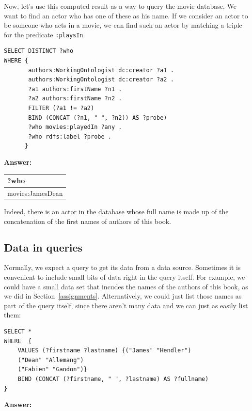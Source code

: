 Now, let's use this computed result as a way to query the movie
database. We want to find an actor who has one of these as his name. If
we consider an actor to be someone who acts in a movie, we can find such
an actor by matching a triple for the predicate \texttt{:playsIn}.


\begin{lstlisting}
SELECT DISTINCT ?who
WHERE {
       authors:WorkingOntologist dc:creator ?a1 . 
       authors:WorkingOntologist dc:creator ?a2 .
       ?a1 authors:firstName ?n1 .
       ?a2 authors:firstName ?n2 .
       FILTER (?a1 != ?a2)
       BIND (CONCAT (?n1, " ", ?n2)) AS ?probe)
       ?who movies:playedIn ?any .
       ?who rdfs:label ?probe .
      }
\end{lstlisting}


\textbf{\textbf{Answer:}}

\begin{tabular}{|l|}
\hline
?who\\
\hline
movies:JamesDean\\
\hline
\end{tabular}

Indeed, there is an actor in the database whose full name is made up of
the concatenation of the first names of authors of this book.

\subsection{Data in queries}
\label{sparqlvalues}

Normally, we expect a query to get its data from a data source.  Sometimes it 
is convenient to include small bits of data right in the query itself.  For example, we 
could have a small data set that incudes the names of the authors of this book, as we did in 
Section~\ref{assignments}.  Alternatively, we could just list those names 
as part of the query itself, since there aren't many data and we can just as easily
list them: 




\begin{lstlisting}
SELECT * 
WHERE  {
    VALUES (?firstname ?lastname) {("James" "Hendler")
    ("Dean" "Allemang")
    ("Fabien" "Gandon")}
    BIND (CONCAT (?firstname, " ", ?lastname) AS ?fullname)
}
\end{lstlisting}

\textbf{\textbf{Answer:}}

